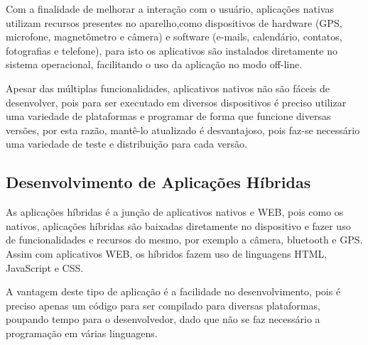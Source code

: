 Com a finalidade de melhorar a interação com o usuário, aplicações nativas utilizam recursos presentes no aparelho,como dispositivos de hardware (GPS, microfone, magnetômetro e câmera) e software (e-mails,  calendário, contatos, fotografias e telefone), para isto os aplicativos são instalados diretamente no sistema operacional, facilitando o uso da aplicação no modo off-line.\cite{toledo2016desenvolvimento}

Apesar das múltiplas funcionalidades, aplicativos nativos não são fáceis de desenvolver, pois para ser executado em diversos dispositivos é preciso utilizar uma variedade de plataformas e programar de forma que funcione diversas versões, por esta razão, mantê-lo atualizado é desvantajoso, pois faz-se necessário uma variedade de teste e distribuição para cada versão.

\subsection{Desenvolvimento de Aplicações Híbridas}

As  aplicações híbridas é a junção de aplicativos nativos e WEB, pois como os nativos, aplicações híbridas são baixadas diretamente no dispositivo e fazer uso de funcionalidades e recursos do mesmo, por exemplo a câmera, bluetooth e GPS. Assim com aplicativos WEB, os híbridos fazem uso de linguagens HTML, JavaScript e CSS. \cite{tavares2016introduccao}

A vantagem deste tipo de aplicação é a facilidade no desenvolvimento, pois é preciso apenas um código para ser compilado para diversas plataformas, poupando tempo para o  desenvolvedor, dado que não se faz necessário a programação em várias linguagens.




